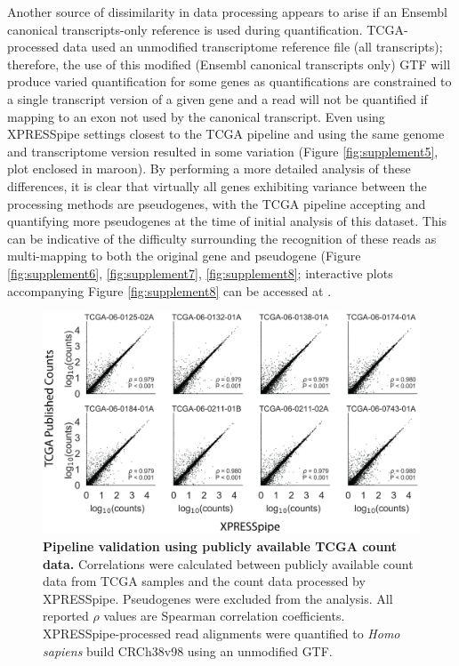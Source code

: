 \documentclass[10pt, oneside]{article}
\begin{document}
Another source of dissimilarity in data processing appears to arise if an Ensembl canonical transcripts-only reference is used during quantification. TCGA-processed data used an unmodified transcriptome reference file (all transcripts); therefore, the use of this modified (Ensembl canonical transcripts only) GTF will produce varied quantification for some genes as quantifications are constrained to a single transcript version of a given gene and a read will not be quantified if mapping to an exon not used by the canonical transcript. Even using XPRESSpipe settings closest to the TCGA pipeline and using the same genome and transcriptome version resulted in some variation (Figure \ref{fig:supplement5}, plot enclosed in maroon). By performing a more detailed analysis of these differences, it is clear that virtually all genes exhibiting variance between the processing methods are pseudogenes, with the TCGA pipeline accepting and quantifying more pseudogenes at the time of initial analysis of this dataset. This can be indicative of the difficulty surrounding the recognition of these reads as multi-mapping to both the original gene and pseudogene (Figure \ref{fig:supplement6}, \ref{fig:supplement7}, \ref{fig:supplement8}; interactive plots accompanying Figure \ref{fig:supplement8} can be accessed at \cite{manuscript}. \\


\begin{figure}
\centering
  \includegraphics[width=180mm]{figures/xpresspipe_supplement8.png}
  \caption{\textbf{Pipeline validation using publicly available TCGA count data.} Correlations were calculated between publicly available count data from TCGA samples and the count data processed by XPRESSpipe. Pseudogenes were excluded from the analysis. All reported $\rho$ values are Spearman correlation coefficients. XPRESSpipe-processed read alignments were quantified to \textit{Homo sapiens} build CRCh38v98 using an unmodified GTF.}
  \label{fig:figure4}
\end{figure}
\end{document}
